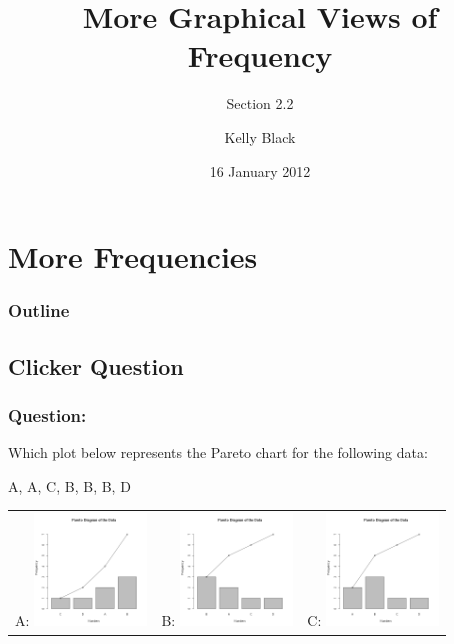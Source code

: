 
\section{More Frequencies}

\title{More Graphical Views of Frequency}
\subtitle{Section 2.2}

\author{Kelly Black}
\date{16 January 2012}

\begin{frame}
  \titlepage
\end{frame}

\begin{frame}
  \frametitle{Outline}
  \tableofcontents[pausesection,hideothersubsections,sectionstyle=show/hide]
\end{frame}


\subsection{Clicker Question}


\begin{frame}
  \frametitle{Question:}

  Which plot below represents the Pareto chart for the following data:

    A, A, C, B, B, B, D

    \begin{tabular}{ccc}
      A: \includegraphics[width=3cm]{img/paretoQuizW1D2-a} &
      B: \includegraphics[width=3cm]{img/paretoQuizW1D2-b} &
      C: \includegraphics[width=3cm]{img/paretoQuizW1D2-c}
  \end{tabular}

\end{frame}


